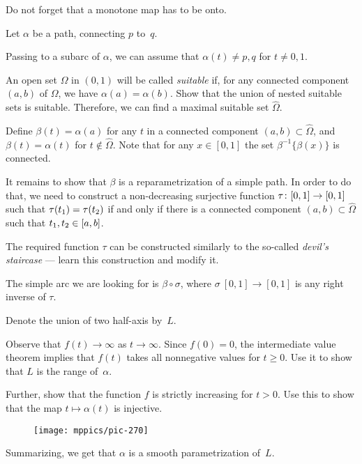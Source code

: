\begin{multicols}{2}
Do not forget that a monotone map has to be onto.

Let $\alpha$ be a path, connecting $p$ to~$q$.

Passing to a subarc of $\alpha$,
we can assume that $\alpha(t)\ne p,q$ for $t\ne0,1$.

An open set $\Omega$ in $(0,1)$ will be called {}\emph{suitable}
if, for any connected component $(a,b)$ of $\Omega$, we have $\alpha(a)=\alpha(b)$.
Show that the union of nested suitable sets is suitable.
Therefore, we can find a maximal suitable set $\hat \Omega$.

Define $\beta(t)=\alpha(a)$ for any $t$ in a connected component $(a,b)\subset\hat \Omega$, and $\beta (t) = \alpha (t) $ for $t\notin\hat{\Omega}$.
Note that for any $x\in [0,1]$ the set $\beta^{-1}\{\beta(x)\}$ is connected.

It remains to show that $\beta$ is a reparametrization of a simple path.
In order to do that, we need to construct a non-decreasing surjective function $\tau\:[0,1]\z\to[0,1]$ such that 
$\tau(t_1)\z=\tau(t_2)$ if and only if there is a connected component $(a,b)\subset\hat \Omega$ such that $t_1,t_2\z\in [a,b]$.

The required function $\tau$ can be constructed similarly to the so-called {}\emph{devil's staircase} --- learn this construction and modify it.

The simple arc we are looking for is $\beta \circ \sigma$, where $\sigma\: [0,1]\to [0,1]$ is any right inverse of $\tau$.

Denote the union of two half-axis by~$L$.

Observe that $f(t)\to\infty$ as $t\to \infty$.
Since $f(0)=0$, the intermediate value theorem implies that $f(t)$ takes all nonnegative values for $t\ge 0$.
Use it to show that $L$ is the range of~$\alpha$.

Further, show that the function $f$ is strictly increasing for $t> 0$.
Use this to show that the map $t\mapsto \alpha(t)$ is injective.

\begin{wrapfigure}{r}{20 mm}
\vskip-7mm
\centering
\texttt{[image: mppics/pic-270]}
\vskip0mm
\end{wrapfigure}

Summarizing, we get that $\alpha$ is a smooth parametrization of~$L$. 


\end{multicols}
